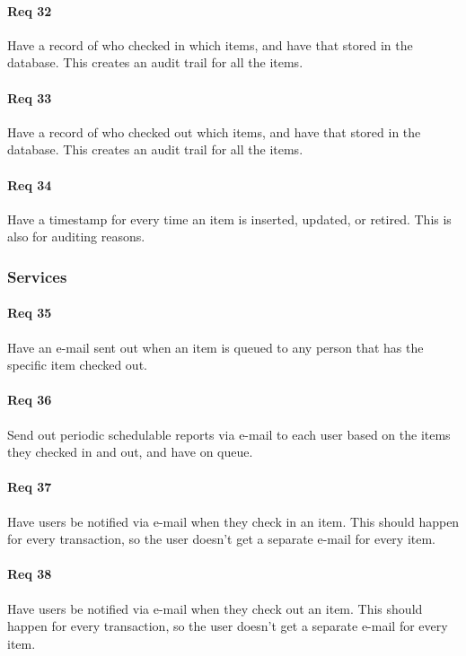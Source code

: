 \documentclass[10pt, onecolumn, twoside, peerreview]{IEEEtran}
\begin{document}
\paragraph*{Req 32}  Have a record of who checked in which items, and have that stored in the database. This creates an audit trail for all
the items.\\

\paragraph*{Req 33} Have a record of who checked out which items, and have that stored in the database. This creates an audit trail for all
the items.\\

\paragraph*{Req 34} Have a timestamp for every time an item is inserted, updated, or retired. This is also for auditing reasons.\\

\subsubsection{Services}
\paragraph*{Req 35} Have an e-mail sent out when an item is queued to any person that has the specific item checked out.\\

\paragraph*{Req 36} Send out periodic schedulable reports via e-mail to each user based on the items they checked in and out, and have on
queue.\\

\paragraph*{Req 37} Have users be notified via e-mail when they check in an item. This should happen for every transaction, so the user
doesn’t get a separate e-mail for every item.\\

\paragraph*{Req 38} Have users be notified via e-mail when they check out an item. This should happen for every transaction, so the user
doesn’t get a separate e-mail for every item.\\
\end{document}
